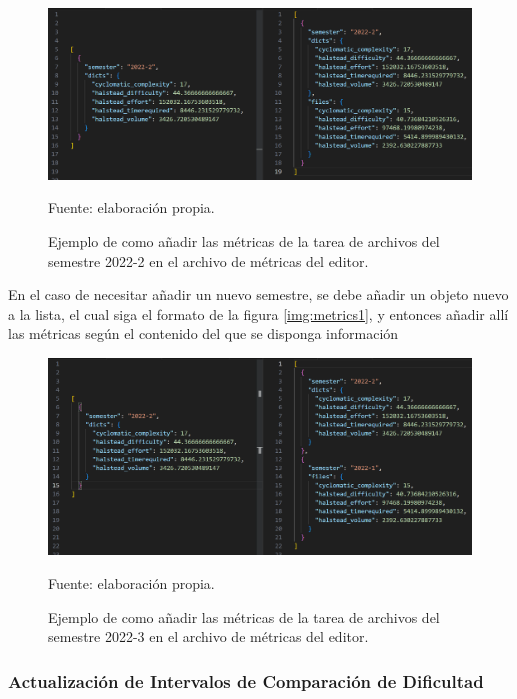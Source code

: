\documentclass[letterpaper,12pt]{article}
\begin{document}
\begin{figure}[H]
  \centering
  \includegraphics[width=1\textwidth]{figures/metrics2.png}
  \caption{Ejemplo de como añadir las métricas de la tarea de archivos del semestre 2022-2 en el archivo de métricas del editor.} Fuente: elaboración propia.
  \label{img:metrics2}
\end{figure}
En el caso de necesitar añadir un nuevo semestre, se debe añadir un objeto nuevo a la lista, el cual siga el formato de la figura \ref{img:metrics1}, y entonces añadir allí las métricas según el contenido del que se disponga información
\begin{figure}[H]
  \centering
  \includegraphics[width=1\textwidth]{figures/metrics3.png}
  \caption{Ejemplo de como añadir las métricas de la tarea de archivos del semestre 2022-3 en el archivo de métricas del editor.} Fuente: elaboración propia.
  \label{img:metrics3}
\end{figure}
\subsubsection{Actualización de Intervalos de Comparación de Dificultad}
\end{document}
